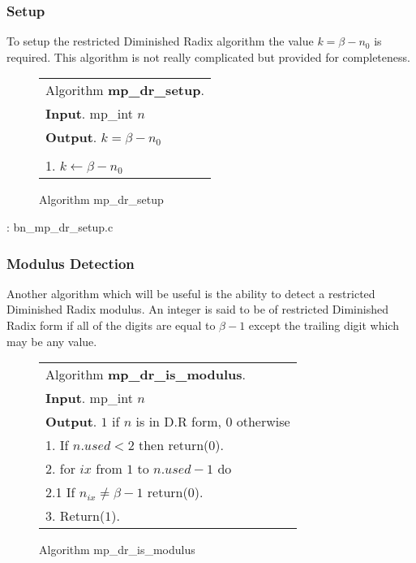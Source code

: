 \documentclass[b5paper]{book}
\begin{document}
\subsubsection{Setup}
To setup the restricted Diminished Radix algorithm the value $k = \beta - n_0$ is required.  This algorithm is not really complicated but provided for
completeness.

\begin{figure}[!here]
\begin{small}
\begin{center}
\begin{tabular}{l}
\hline Algorithm \textbf{mp\_dr\_setup}. \\
\textbf{Input}.   mp\_int $n$ \\
\textbf{Output}.  $k = \beta - n_0$ \\
\hline \\
1.  $k \leftarrow \beta - n_0$ \\
\hline
\end{tabular}
\end{center}
\end{small}
\caption{Algorithm mp\_dr\_setup}
\end{figure}

\vspace{+3mm}\begin{small}
\hspace{-5.1mm}{\bf File}: bn\_mp\_dr\_setup.c
\vspace{-3mm}
\begin{alltt}
\end{alltt}
\end{small}

\subsubsection{Modulus Detection}
Another algorithm which will be useful is the ability to detect a restricted Diminished Radix modulus.  An integer is said to be
of restricted Diminished Radix form if all of the digits are equal to $\beta - 1$ except the trailing digit which may be any value.

\begin{figure}[!here]
\begin{small}
\begin{center}
\begin{tabular}{l}
\hline Algorithm \textbf{mp\_dr\_is\_modulus}. \\
\textbf{Input}.   mp\_int $n$ \\
\textbf{Output}.  $1$ if $n$ is in D.R form, $0$ otherwise \\
\hline
1.  If $n.used < 2$ then return($0$). \\
2.  for $ix$ from $1$ to $n.used - 1$ do \\
\hspace{3mm}2.1  If $n_{ix} \ne \beta - 1$ return($0$). \\
3.  Return($1$). \\
\hline
\end{tabular}
\end{center}
\end{small}
\caption{Algorithm mp\_dr\_is\_modulus}
\end{figure}
\end{document}
